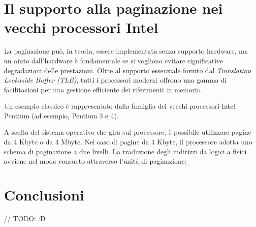 \section{Il supporto alla paginazione nei vecchi processori Intel}
La paginazione può, in teoria, essere implementata senza supporto hardware, ma un aiuto dall'hardware è fondamentale se si vogliono evitare significative degradazioni delle prestazioni. Oltre al supporto essenziale fornito dal \emph{Translation Lookaside Buffer (TLB)}, tutti i processori moderni offrono una gamma di facilitazioni per una gestione efficiente dei riferimenti in memoria.

Un esempio classico è rappresentato dalla famiglia dei vecchi processori Intel Pentium (ad esempio, Pentium 3 e 4). 

A scelta del sistema operativo che gira sul processore, è possibile utilizzare pagine da 4 Kbyte o da 4 Mbyte. Nel caso di pagine da 4 Kbyte, il processore adotta uno schema di paginazione a due livelli. La traduzione degli indirizzi da logici a fisici avviene nel modo consueto attraverso l'unità di paginazione:


\section{Conclusioni}
// TODO: :D